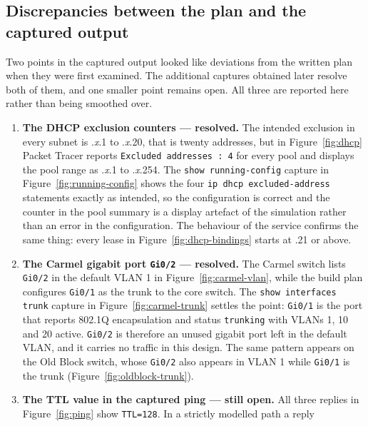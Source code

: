 \documentclass[11pt,a4paper]{article}
\newcommand{\figref}[1]{Figure~\ref{#1}}
\begin{document}
\subsection{Discrepancies between the plan and the captured output}
\label{sec:discrepancies}

\noindent
Two points in the captured output looked like deviations from the written plan when
they were first examined. The additional captures obtained later resolve both of
them, and one smaller point remains open. All three are reported here rather than
being smoothed over.

\begin{enumerate}[label=\textbf{D\arabic*.},leftmargin=2.2em]
  \item \textbf{The DHCP exclusion counters --- resolved.} The intended exclusion in
        every subnet is .\textit{x}.1 to .\textit{x}.20, that is twenty addresses, but
        in \figref{fig:dhcp} Packet Tracer reports \texttt{Excluded addresses : 4} for
        every pool and displays the pool range as .\textit{x}.1 to .\textit{x}.254.
        The \texttt{show running-config} capture in \figref{fig:running-config} shows
        the four \texttt{ip dhcp excluded-address} statements exactly as intended, so
        the configuration is correct and the counter in the pool summary is a display
        artefact of the simulation rather than an error in the configuration. The
        behaviour of the service confirms the same thing: every lease in
        \figref{fig:dhcp-bindings} starts at .21 or above.
  \item \textbf{The Carmel gigabit port \texttt{Gi0/2} --- resolved.} The Carmel switch
        lists \texttt{Gi0/2} in the default VLAN 1 in \figref{fig:carmel-vlan}, while
        the build plan configures \texttt{Gi0/1} as the trunk to the core switch. The
        \texttt{show interfaces trunk} capture in \figref{fig:carmel-trunk} settles the
        point: \texttt{Gi0/1} is the port that reports 802.1Q encapsulation and status
        \texttt{trunking} with VLANs 1, 10 and 20 active. \texttt{Gi0/2} is therefore
        an unused gigabit port left in the default VLAN, and it carries no traffic in
        this design. The same pattern appears on the Old Block switch, whose
        \texttt{Gi0/2} also appears in VLAN 1 while \texttt{Gi0/1} is the trunk
        (\figref{fig:oldblock-trunk}).
  \item \textbf{The TTL value in the captured ping --- still open.} All three replies in
        \figref{fig:ping} show \texttt{TTL=128}. In a strictly modelled path a reply

\end{enumerate}
\end{document}
